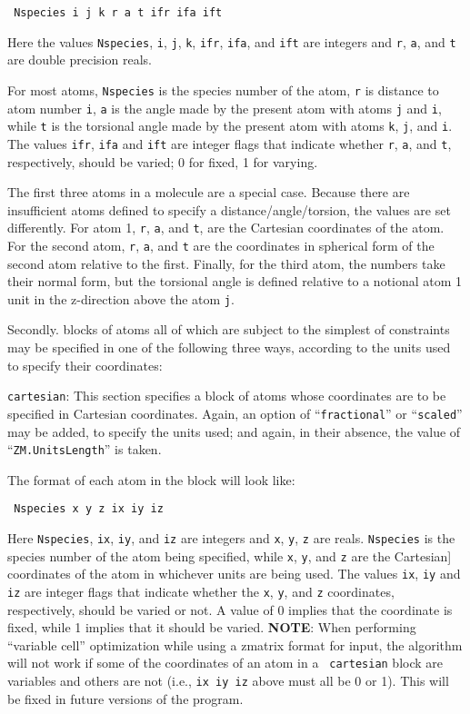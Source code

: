 \documentclass[11pt]{article}
\begin{document}
\begin{description}
\noindent\texttt{    Nspecies i j k r a t ifr ifa ift}

Here the values \texttt{Nspecies}, \texttt{i}, \texttt{j}, \texttt{k},
\texttt{ifr}, \texttt{ifa}, and \texttt{ift} are integers and
\texttt{r}, \texttt{a}, and \texttt{t} are double precision reals.

For most atoms, \texttt{Nspecies} is the species number of the atom,
\texttt{r} is distance to atom number \texttt{i}, \texttt{a} is the
angle made by the present atom with atoms \texttt{j} and \texttt{i},
while \texttt{t} is the torsional angle made by the present atom with
atoms \texttt{k}, \texttt{j}, and \texttt{i}. The values \texttt{ifr},
\texttt{ifa} and \texttt{ift} are integer flags that indicate whether
\texttt{r}, \texttt{a}, and \texttt{t}, respectively, should be
varied; 0 for fixed, 1 for varying.


The first three atoms in a molecule are a special case. Because there
are insufficient atoms defined to specify a distance/angle/torsion,
the values are set differently. For atom 1, \texttt{r}, \texttt{a},
and \texttt{t}, are the Cartesian coordinates of the atom.  For the
second atom, \texttt{r}, \texttt{a}, and \texttt{t} are the
coordinates in spherical form of the second atom relative to the
first. Finally, for the third atom, the numbers take their normal
form, but the torsional angle is defined relative to a notional atom 1
unit in the z-direction above the atom \texttt{j}.

Secondly. blocks of atoms all of which are subject to the simplest of constraints
may be specified in one of the following three ways, according to the units used
to specify their coordinates:


\item \texttt{cartesian}: This section specifies a block of atoms
whose coordinates are to be specified in Cartesian coordinates. Again,
an option of ``\texttt{fractional}'' or ``\texttt{scaled}'' may be
added, to specify the units used; and again, in their absence, the
value of ``\texttt{ZM.UnitsLength}'' is taken.

The format of each atom in the block will look like:

\noindent\texttt{      Nspecies x y z ix iy iz}

Here \texttt{Nspecies}, \texttt{ix}, \texttt{iy}, and \texttt{iz} are
integers and \texttt{x}, \texttt{y}, \texttt{z} are
reals. \texttt{Nspecies} is the species number of the atom being
specified, while \texttt{x}, \texttt{y}, and \texttt{z} are the
Cartesian] coordinates of the atom in whichever units are being
used. The values \texttt{ix}, \texttt{iy} and \texttt{iz} are integer
flags that indicate whether the \texttt{x}, \texttt{y}, and \texttt{z}
coordinates, respectively, should be varied or not. A value of 0
implies that the coordinate is fixed, while 1 implies that it should
be varied.  {\bf NOTE}: When performing ``variable cell''
optimization while using a zmatrix format for input, the algorithm
will not work if some of the coordinates of an atom in a {\tt
cartesian} block are variables and others are not (i.e., 
\texttt{ix iy iz} above must all be 0 or 1). This will be fixed in
future versions of the program.


\end{description}
\end{document}
